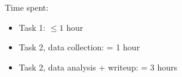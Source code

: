 \documentclass{lab}
\begin{document}








Time spent:

\begin{itemize}
  \item Task 1: $\leq 1$ hour
  \item Task 2, data collection: = 1 hour
  \item Task 2, data analysis + writeup: = 3 hours
\end{itemize}
\end{document}
